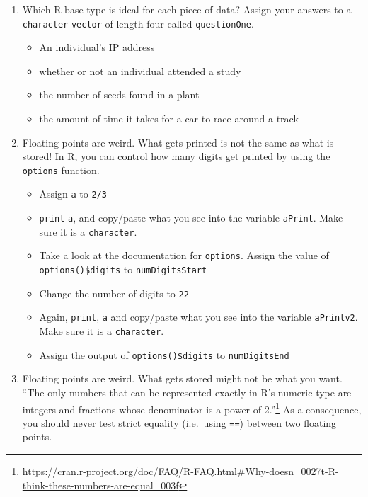 \documentclass[12pt,krantz2]{krantz}
\providecommand{\tightlist}{%
  \setlength{\itemsep}{0pt}\setlength{\parskip}{0pt}}
\renewcommand{\href}[2]{#2\footnote{\url{#1}}}
\begin{document}
\begin{enumerate}
\def\labelenumi{\arabic{enumi}.}
\item
  Which R base type is ideal for each piece of data? Assign your answers to a \texttt{character} \texttt{vector} of length four called \texttt{questionOne}.

  \begin{itemize}
  \tightlist
  \item
    An individual's IP address
  \item
    whether or not an individual attended a study
  \item
    the number of seeds found in a plant
  \item
    the amount of time it takes for a car to race around a track
  \end{itemize}
\item
  Floating points are weird. What gets printed is not the same as what is stored! In R, you can control how many digits get printed by using the \texttt{options} function.

  \begin{itemize}
  \tightlist
  \item
    Assign \texttt{a} to \texttt{2/3}
  \item
    \texttt{print} \texttt{a}, and copy/paste what you see into the variable \texttt{aPrint}. Make sure it is a \texttt{character}.
  \item
    Take a look at the documentation for \texttt{options}. Assign the value of \texttt{options()\$digits} to \texttt{numDigitsStart}
  \item
    Change the number of digits to \texttt{22}
  \item
    Again, \texttt{print}, \texttt{a} and copy/paste what you see into the variable \texttt{aPrintv2}. Make sure it is a \texttt{character}.
  \item
    Assign the output of \texttt{options()\$digits} to \texttt{numDigitsEnd}
  \end{itemize}
\item
  Floating points are weird. What gets stored might not be what you want. \href{https://cran.r-project.org/doc/FAQ/R-FAQ.html\#Why-doesn_0027t-R-think-these-numbers-are-equal_003f}{``The only numbers that can be represented exactly in R's numeric type are integers and fractions whose denominator is a power of 2.''} As a consequence, you should never test strict equality (i.e.~using \texttt{==}) between two floating points.


\end{enumerate}
\end{document}
